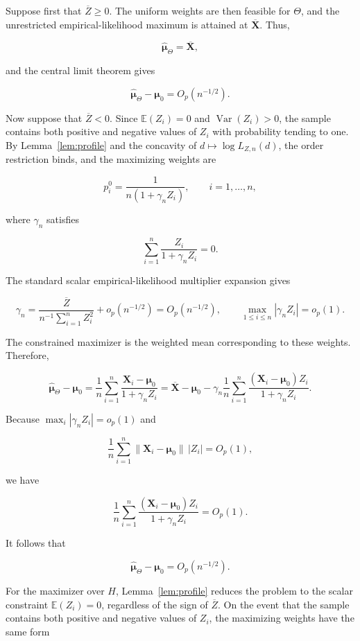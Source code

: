 \documentclass[11pt]{article}
\theoremstyle{remark}
\newcommand{\E}{\mathbb{E}}
\begin{document}
Suppose first that $\overline{Z}\geq0$. The uniform weights are then feasible for $\Theta$, and the unrestricted empirical-likelihood maximum is attained at $\overline{\boldsymbol{X}}$. Thus,

$$ \widehat{\boldsymbol{\mu}}_\Theta=\overline{\boldsymbol{X}}, $$

and the central limit theorem gives

$$ \widehat{\boldsymbol{\mu}}_\Theta-\boldsymbol{\mu}_0=O_p(n^{-1/2}). $$

Now suppose that $\overline{Z}<0$. Since $\E(Z_i)=0$ and $\operatorname{Var}(Z_i)>0$, the sample contains both positive and negative values of $Z_i$ with probability tending to one. By Lemma~\ref{lem:profile} and the concavity of $d\mapsto\log L_{Z,n}(d)$, the order restriction binds, and the maximizing weights are

$$ p_i^0=\frac{1}{n(1+\gamma_nZ_i)},\qquad i=1,\ldots,n, $$

where $\gamma_n$ satisfies

$$ \sum_{i=1}^n\frac{Z_i}{1+\gamma_nZ_i}=0. $$

The standard scalar empirical-likelihood multiplier expansion \citet{owen2001} gives

$$ \gamma_n=\frac{\overline{Z}}{n^{-1}\sum_{i=1}^nZ_i^2}+o_p(n^{-1/2})=O_p(n^{-1/2}),\qquad \max_{1\leq i\leq n}|\gamma_nZ_i|=o_p(1). $$

The constrained maximizer is the weighted mean corresponding to these weights. Therefore,

$$ \widehat{\boldsymbol{\mu}}_\Theta-\boldsymbol{\mu}_0=\frac{1}{n}\sum_{i=1}^n\frac{\boldsymbol{X}_i-\boldsymbol{\mu}_0}{1+\gamma_nZ_i}=\overline{\boldsymbol{X}}-\boldsymbol{\mu}_0-\gamma_n\frac{1}{n}\sum_{i=1}^n\frac{(\boldsymbol{X}_i-\boldsymbol{\mu}_0)Z_i}{1+\gamma_nZ_i}. $$

Because $\max_i|\gamma_nZ_i|=o_p(1)$ and

$$ \frac{1}{n}\sum_{i=1}^n\|\boldsymbol{X}_i-\boldsymbol{\mu}_0\|\,|Z_i|=O_p(1), $$

we have

$$ \frac{1}{n}\sum_{i=1}^n\frac{(\boldsymbol{X}_i-\boldsymbol{\mu}_0)Z_i}{1+\gamma_nZ_i}=O_p(1). $$

It follows that

$$ \widehat{\boldsymbol{\mu}}_\Theta-\boldsymbol{\mu}_0=O_p(n^{-1/2}). $$

For the maximizer over $H$, Lemma~\ref{lem:profile} reduces the problem to the scalar constraint $\E(Z_i)=0$, regardless of the sign of $\overline{Z}$. On the event that the sample contains both positive and negative values of $Z_i$, the maximizing weights have the same form
\end{document}

